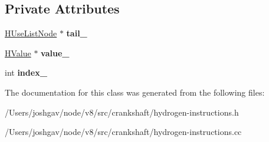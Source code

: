 \subsection*{Private Attributes}
\begin{DoxyCompactItemize}
\item 
\hyperlink{classv8_1_1internal_1_1_h_use_list_node}{H\+Use\+List\+Node} $\ast$ {\bfseries tail\+\_\+}\hypertarget{classv8_1_1internal_1_1_h_use_list_node_a255d29958ebc1f451bc2ed439db89068}{}\label{classv8_1_1internal_1_1_h_use_list_node_a255d29958ebc1f451bc2ed439db89068}

\item 
\hyperlink{classv8_1_1internal_1_1_h_value}{H\+Value} $\ast$ {\bfseries value\+\_\+}\hypertarget{classv8_1_1internal_1_1_h_use_list_node_aab58ff29952ccc8cddd229b2f35a4aef}{}\label{classv8_1_1internal_1_1_h_use_list_node_aab58ff29952ccc8cddd229b2f35a4aef}

\item 
int {\bfseries index\+\_\+}\hypertarget{classv8_1_1internal_1_1_h_use_list_node_a1f9b86b5564b9c721812130250754fdb}{}\label{classv8_1_1internal_1_1_h_use_list_node_a1f9b86b5564b9c721812130250754fdb}

\end{DoxyCompactItemize}


The documentation for this class was generated from the following files\+:\begin{DoxyCompactItemize}
\item 
/\+Users/joshgav/node/v8/src/crankshaft/hydrogen-\/instructions.\+h\item 
/\+Users/joshgav/node/v8/src/crankshaft/hydrogen-\/instructions.\+cc\end{DoxyCompactItemize}
